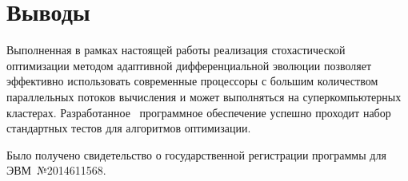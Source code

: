 \begin{longtabu}
\bottomrule %
\end{longtabu} \endgroup




\section{Выводы}

Выполненная в рамках настоящей работы реализация стохастической
оптимизации методом адаптивной дифференциальной эволюции позволяет
эффективно использовать современные процессоры с большим количеством
параллельных потоков вычисления и может выполняться на
суперкомпьютерных кластерах.  Разработанное~\cite{JADE-web} программное обеспечение
успешно проходит набор стандартных тестов для алгоритмов оптимизации.

 Было получено
свидетельство о государственной регистрации программы для
ЭВМ~№2014611568.
\clearpage